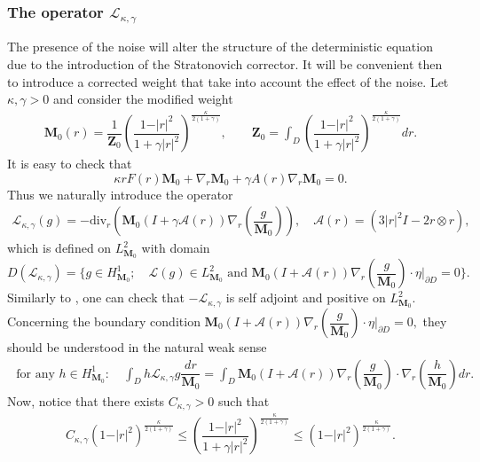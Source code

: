 \documentclass[a4paper,12pt, reqno]{amsart}
\newcommand{\M}{\mathbf{M}}
\renewcommand{\k}{\kappa}
\newcommand{\Div}{\text{div}}
\begin{document}
\subsubsection{The operator $\mathcal{L}_{\kappa,\gamma}$}\label{sec:mod_operator}
The presence of the noise will alter the structure of the deterministic equation due to the introduction of the Stratonovich corrector. It will be convenient then to introduce a corrected weight that take into account the effect of the noise. Let $\kappa,\gamma>0$ and consider the modified weight
\begin{align}\label{weight-limit}
     \mathbf{M}_0(r)= \dfrac{1}{\mathbf{Z}_0} \left(
\dfrac{1 - \vert r\vert^{2}}{1 + \gamma \vert r\vert^{2}}
\right)^{\frac{\kappa}{2\left(1 + \gamma\right)}}, \qquad  \mathbf{Z}_0=\int_D \left(
\dfrac{1 - \vert r\vert^{2}}{1 + \gamma \vert r\vert^{2}}
\right)^{\frac{\kappa}{2\left(1 + \gamma\right)}} dr.
\end{align}
It is easy to check that 
\begin{equation}\label{elliptic-eq-M0}
    \k rF(r)\M_0 + \nabla_r \M_0+ \gamma A(r)\nabla_r \M_0 =0.
\end{equation}
Thus we naturally introduce the operator
\begin{align}\label{operator-limit}
 \mathcal{L}_{\kappa,\gamma}(g)=-\Div_r\left(\mathbf{M}_0 (I+\gamma\mathcal{A}(r))\nabla_r(\dfrac{g}{\mathbf{M}_0})\right),    \quad  \mathcal{A}(r)= (3 \left\vert r\right\vert^2I-2r\otimes r),
\end{align}
 which is  defined on  $L^2_{\mathbf{M}_0}$ with domain $$D(\mathcal{L}_{\kappa,\gamma})=\{ g\in H^1_{\mathbf{M}_0};\quad \mathcal{L}(g)\in L^2_{\mathbf{M}_0} \text{ and }  \mathbf{M}_0 (I+\mathcal{A}(r))\nabla_r(\dfrac{g}{\mathbf{M}_0})\cdot \eta\vert_{\partial D}=0\}.$$ Similarly to \cite[Prop. 3.6.]{Masmoudi2008}, one can check that $-\mathcal{L}_{\kappa,\gamma}$ is self adjoint and positive  on $L^2_{\mathbf{M}_0}$.
Concerning the boundary condition $\mathbf{M}_0 (I+\mathcal{A}(r))\nabla_r(\dfrac{g}{\mathbf{M}_0})\cdot \eta\vert_{\partial D}=0,$ they should be understood in the natural weak sense  
\begin{align}\label{BC-sense-limit-case}
\text{ for any } h\in H^1_{\mathbf{M}_0}: \quad    \int_D h \mathcal{L}_{\kappa,\gamma} g \dfrac{dr}{\mathbf{M}_0}=\int_D \mathbf{M}_0(I+\mathcal{A}(r))\nabla_r(\dfrac{g}{\mathbf{M}_0})\cdot \nabla_r(\dfrac{h}{\mathbf{M}_0}) dr.
\end{align}
Now, notice that  there exists $C_{\kappa,\gamma}>0$  such that
\begin{align*}
  C_{\kappa,\gamma}(1 - \vert r\vert^{2})^{\frac{\kappa}{2\left(1 + \gamma\right)}} \leq   \left(
\dfrac{1 - \vert r\vert^{2}}{1 + \gamma \vert r\vert^{2}}
\right)^{\frac{\kappa}{2\left(1 + \gamma\right)}}
\leq (1 - \vert r\vert^{2})^{\frac{\kappa}{2\left(1 + \gamma\right)}}.
\end{align*}
\end{document}

